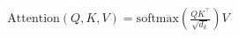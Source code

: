 \documentclass[preview]{standalone}
\begin{document}
\begin{align*}
\text{Attention}(Q,K,V) = \text{softmax}\left(\frac{QK^\top}{\sqrt{d_k}}\right)V
\end{align*}
\end{document}
